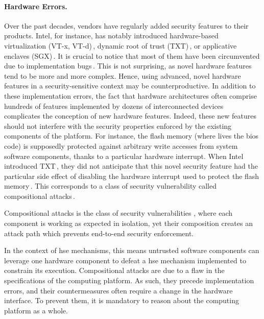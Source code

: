 \paragraph{Hardware Errors.}
%
Over the past decades, vendors have regularly added security features to their
products.
%
Intel, for instance, has notably introduced hardware-based virtualization (VT-x,
VT-d)\,\cite{intel2014manualvt}, dynamic root of trust
(TXT)\,\cite{intel2015txt}, or applicative enclaves
(SGX)\,\cite{intel2014manualsgx,costan2016sgxexplained}.
%
It is crucial to notice that most of them have been circumvented due to
implementation bugs\,\cite{wojtczuk2011txtbug,sang2010iommu}.
%
This is not surprising, as novel hardware features tend to be more and more
complex.
%
Hence, using advanced, novel hardware features in a security-sensitive context
may be counterproductive.
%
In addition to these implementation errors, the fact that hardware architectures
often comprise hundreds of features implemented by dozens of interconnected
devices complicates the conception of new hardware features.
%
Indeed, these new features should not interfere with the security properties
enforced by the existing components of the platform.
%
For instance, the flash memory (where lives the \ac{bios} code) is supposedly
protected against arbitrary write accesses from system software components,
thanks to a particular hardware interrupt.
%
When Intel introduced TXT\,\cite{intel2015txt}, they did not anticipate that
this novel security feature had the particular side effect of disabling the
hardware interrupt used to protect the flash memory\,\cite{kovah2015senter}.
%
This corresponds to a class of security vulnerability called compositional
attacks\,\cite{wing2003compositionalattack}. 

\begin{definition}
  Compositional attacks is the class of security vulnerabilities , where each
  component is working as expected in isolation, yet their composition creates
  an attack path which prevents end-to-end security enforcement.
\end{definition}

In the context of \ac{hse} mechanisms, this means untrusted software components
can leverage one hardware component to defeat a \ac{hse} mechanism implemented
to constrain its execution.
%
%
Compositional attacks are due to a flaw in the specifications of the computing
platform.
%
As such, they precede implementation errors, and their countermeasures often
require a change in the hardware interface.
%
To prevent them, it is mandatory to reason about the computing platform as a
whole.

